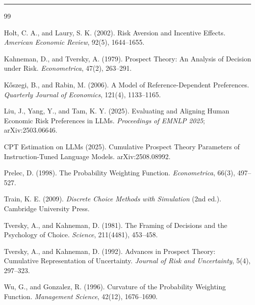 \documentclass[11pt]{article}
\begin{document}
\vspace{1em}
\hrule
\vspace{0.5em}

\begin{thebibliography}{99}
\small

Holt, C. A., and Laury, S. K. (2002).
Risk Aversion and Incentive Effects. \textit{American Economic Review}, 92(5), 1644--1655.

Kahneman, D., and Tversky, A. (1979).
Prospect Theory: An Analysis of Decision under Risk. \textit{Econometrica}, 47(2), 263--291.

K\H{o}szegi, B., and Rabin, M. (2006).
A Model of Reference-Dependent Preferences. \textit{Quarterly Journal of Economics}, 121(4), 1133--1165.

Liu, J., Yang, Y., and Tam, K. Y. (2025).
Evaluating and Aligning Human Economic Risk Preferences in LLMs.
\textit{Proceedings of EMNLP 2025}; arXiv:2503.06646.

CPT Estimation on LLMs (2025). Cumulative Prospect Theory Parameters of Instruction-Tuned Language
Models. arXiv:2508.08992.

Prelec, D. (1998).
The Probability Weighting Function. \textit{Econometrica}, 66(3), 497--527.

Train, K. E. (2009).
\textit{Discrete Choice Methods with Simulation} (2nd ed.). Cambridge University Press.

Tversky, A., and Kahneman, D. (1981).
The Framing of Decisions and the Psychology of Choice. \textit{Science}, 211(4481), 453--458.

Tversky, A., and Kahneman, D. (1992).
Advances in Prospect Theory: Cumulative Representation of Uncertainty.
\textit{Journal of Risk and Uncertainty}, 5(4), 297--323.

Wu, G., and Gonzalez, R. (1996).
Curvature of the Probability Weighting Function. \textit{Management Science}, 42(12), 1676--1690.

\end{thebibliography}
\end{document}
